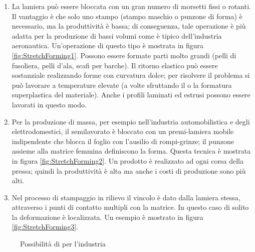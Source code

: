 \begin{enumerate}
\item La lamiera può essere bloccata con un gran numero di morsetti fissi o rotanti.
Il vantaggio è che solo uno stampo (stampo maschio o punzone di forma) è necessario, ma la produttività è bassa; di conseguenza, tale operazione è più adatta per la produzione di bassi volumi come è tipico dell'industria aeronautica. Un'operazione di questo tipo è mostrata in figura \ref{fig:StretchForming1}.
Possono essere formate parti molto grandi (pelli di fusoliera, pelli d'ala, scafi per barche).
Il ritorno elastico può essere sostanziale realizzando forme con curvatura dolce; per risolvere il problema si può lavorare a temperature elevate (a volte sfruttando il  o la formatura superplastica del materiale).
Anche i profili laminati ed estrusi possono essere lavorati in questo modo.
\item Per la produzione di massa, per esempio nell'industria automobilistica e degli elettrodomestici, il semilavorato è bloccato con un premi-lamiera mobile indipendente che blocca il foglio con l'ausilio di rompi-grinze; il punzone assieme alla matrice femmina definiscono la forma. Questa tecnica è mostrata in figura \ref{fig:StretchForming2}.
Un prodotto è realizzato ad ogni corsa della pressa; quindi la produttività è alta ma anche i costi di produzione sono più alti.
\item Nel processo di stampaggio in rilievo il vincolo è dato dalla lamiera stessa, attraverso i punti di contatto multipli con la matrice. In questo caso di solito la deformazione è localizzata. Un esempio è mostrato in figura \ref{fig:StretchForming3}.
\end{enumerate}

\begin{figure}
\centering
{}\quad
{}\quad
{}
\caption{Possibilità di  per l'industria}
\label{fig:StretchForming}
\end{figure}

